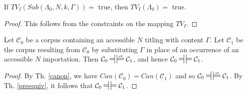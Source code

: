 \documentclass{IOS-Book-Article}
\newcommand{\corp}{ \mathcal{C} }
\newcommand{\ttl}{\mathit{ttl}}
\newcommand{\txt}{\mathit{txt}}
\newcommand{\Canon}{\mathit{Can}}
\newcommand{\TV}{\mathit{TV}}
\newcommand{\Sub}{\mathit{Sub}}
\newcommand{\mdpfEquiv}{\ensuremath{\ndststile[ss]{\hspace*{3 pt }}{}\hspace*{3 pt}\sdtstile[ss]{}{}}}
\newcommand{\mdpfstruct}{\ensuremath{\sdtstile[ss]{}{st}}}
\newcommand{\mdpfstructEquiv}{\ensuremath{\ndststile[ss]{\hspace*{3 pt }}{}\hspace*{3 pt}\sdtstile[ss]{}{st}}}
\newcommand{\mycomment}[1]{}
\begin{document}
{\begin{lem}
\label{replace2}
If $\TV_I(\Sub(\Lambda_0, N, k, \Gamma)) =$ true, then $\TV_I(\Lambda_0) =$ true.
\begin{proof}
This follows from the constraints on the mapping $\TV_I$.
\end{proof}
\end{lem}
}


\begin{theo}
\label{replace}
Let $\corp_0$ be a corpus containing an accessible $N$ titling with content $\Gamma$. 
Let $\corp_1$ be the corpus resulting from $\corp_0$ by substituting $\Gamma$ in place of an occurrence of an accessible $N$ importation.
Then $\corp_0\mdpfstructEquiv\corp_1$, and hence $\corp_0\mdpfEquiv\corp_1$.
\begin{proof}
\mycomment{%
If $\corp_0\mdpfstruct\bot$, then its formal corpus contains inconsistent titlings, which also belong to $\corp_1$. Therefore $\corp_0\mdpfstruct\bot$, and so $\corp_0\mdpfstructEquiv\corp_1$ and $\corp_0\mdpfEquiv\corp_1$.}
By Th. \ref{canon}, we have $\Canon(\corp_0) = \Canon(\corp_1)$ and so $\corp_0\mdpfstructEquiv\corp_1$. By Th. \ref{preequiv}, it follows that $\corp_0\mdpfEquiv\corp_1$. 
\mycomment{ %
We first show that $\corp_0$ entails $\corp_1$. Let $I$ be a structural interpretation that satisfies $\corp_0$. Then $ttl_I(N)=\Gamma$. Therefore, $\corp_1$ is a subset of the importation closure of $\corp_0$ under $\ttl_I$, and by Lemma \ref{replace1}, $I$ satisfies $\corp_1$.

Next, we show that $\corp_1$ entails $\corp_0$.
Let $I$ be a structural interpretation that satisfies $\corp_1$.
Now any accessible titling in $\corp_0$ is also accessible in $\corp_1$, so $ttl_I(N)=\Gamma$.
Let $\Lambda_0$ be any text in $\corp_0 - \corp_1$. Then for some $m\ge 1$, $\Lambda_1 = \Sub(\Lambda_0, N, m, \Gamma)$ belongs to $\corp_1^I$ and so $\TV_I(\Lambda_1) =$ true. By Lemma \ref{replace2}, then $\TV_I(\Lambda_0)= $ true.}
\end{proof}  
\end{theo}

\mycomment{%
\begin{lem}
\label{delete1}
$\Gamma$ entails $\Sub(\Gamma, N, k, \txt)$ where $\txt$ is the empty text construction.
\begin{proof}
Let $I$ be any structural interpretation.
Let $\Gamma_1 = \Sub(\Gamma, N, k, \txt)$. Then $\TV_I(\Gamma)= \TV_I(\Gamma_1)$.
Reversing the substitution by @@@replacing the $\txt$ occurrence with the original importation maps the importation closure of $\Gamma_1^I$ into $\Gamma^I$, with preservation of $\TV_I$.
Therefore, if $I$ satisfies $\Gamma$ it also satisfies $\Gamma_1$.
\end{proof}
\end{lem}
}
\end{document}
